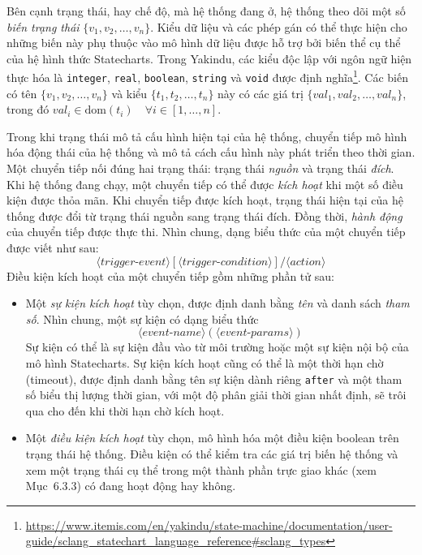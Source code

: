 Bên cạnh trạng thái, hay chế độ, mà hệ thống đang ở, hệ thống theo dõi một số \emph{biến trạng thái} $\{v_1,v_2,\ldots,v_n\}$. Kiểu dữ liệu và các phép gán có thể thực hiện cho những biến này phụ thuộc vào mô hình dữ liệu được hỗ trợ bởi biến thể cụ thể của hệ hình thức Statecharts. Trong Yakindu, các kiểu độc lập với ngôn ngữ hiện thực hóa là \texttt{integer}, \texttt{real}, \texttt{boolean}, \texttt{string} và \texttt{void} được định nghĩa\footnote{\url{https://www.itemis.com/en/yakindu/state-machine/documentation/user-guide/sclang_statechart_language_reference\#sclang_types}}. Các biến có tên $\{v_1,v_2,\ldots,v_n\}$ và kiểu $\{t_1,t_2,\ldots,t_n\}$ này có các giá trị $\{val_1,val_2,\ldots,val_n\}$, trong đó $val_i\in\mathrm{dom}(t_i)\quad\forall i\in[1,\ldots,n]$.

Trong khi trạng thái mô tả cấu hình hiện tại của hệ thống, chuyển tiếp mô hình hóa động thái của hệ thống và mô tả cách cấu hình này phát triển theo thời gian. Một chuyển tiếp nối đúng hai trạng thái: trạng thái \emph{nguồn} và trạng thái \emph{đích}. Khi hệ thống đang chạy, một chuyển tiếp có thể được \emph{kích hoạt} khi một số điều kiện được thỏa mãn. Khi chuyển tiếp được kích hoạt, trạng thái hiện tại của hệ thống được đổi từ trạng thái nguồn sang trạng thái đích. Đồng thời, \emph{hành động} của chuyển tiếp được thực thi. Nhìn chung, dạng biểu thức của một chuyển tiếp được viết như sau: 
\[
\langle\textit{trigger-event}\rangle[\langle\textit{trigger-condition}\rangle]/\langle\textit{action}\rangle
\]
 Điều kiện kích hoạt của một chuyển tiếp gồm những phần tử sau:
\begin{itemize}
\item Một \emph{sự kiện kích hoạt} tùy chọn, được định danh bằng \emph{tên} và danh sách \emph{tham số}. Nhìn chung, một sự kiện có dạng biểu thức 
\[
\langle\textit{event-name}\rangle(\langle\textit{event-params}\rangle)
\]
 Sự kiện có thể là sự kiện đầu vào từ môi trường hoặc một sự kiện nội bộ của mô hình Statecharts. Sự kiện kích hoạt cũng có thể là một
thời hạn chờ (timeout), được định danh bằng tên sự kiện dành riêng \texttt{after} và một tham số biểu thị lượng thời gian, với một độ phân giải thời gian nhất định, sẽ trôi qua cho đến khi thời hạn chờ kích hoạt.
\item Một \emph{điều kiện kích hoạt} tùy chọn, mô hình hóa một điều kiện boolean trên trạng thái hệ thống. Điều kiện có thể kiểm tra các giá trị biến hệ thống và xem một trạng thái cụ thể trong một thành phần trực giao khác (xem Mục~6.3.3) có đang hoạt động hay không.
\end{itemize}

